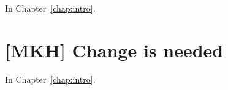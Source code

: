 In Chapter~\ref{chap:intro}.


\section{[MKH] Change is needed}
\label{sec:change_needed}

In Chapter~\ref{chap:intro}.














%
%


